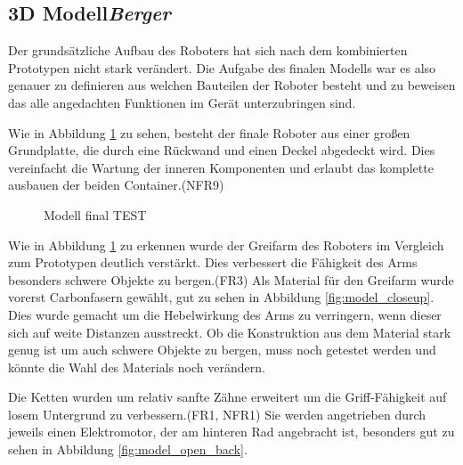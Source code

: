 \subsection{3D Modell\hfill\textnormal{\emph{Berger}}}

Der grundsätzliche Aufbau des Roboters hat sich nach dem kombinierten Prototypen nicht stark verändert.
Die Aufgabe des finalen Modells war es also 
genauer zu definieren aus welchen Bauteilen der Roboter besteht
und zu beweisen das alle angedachten Funktionen im Gerät unterzubringen sind.

Wie in Abbildung \ref{fig:model_open_front} zu sehen, 
besteht der finale Roboter aus einer großen Grundplatte, 
die durch eine Rückwand und einen Deckel abgedeckt wird.
Dies vereinfacht die Wartung der inneren Komponenten
und erlaubt das komplette ausbauen der beiden Container.(NFR9)

\begin{figure}[H]
  \caption{Modell final TEST}
  \label{fig:model_open_front}
\end{figure}

Wie in Abbildung \ref{fig:model_open_front} zu erkennen
wurde der Greifarm des Roboters im Vergleich zum Prototypen deutlich verstärkt.
Dies verbessert die Fähigkeit des Arms besonders schwere Objekte zu bergen.(FR3)
Als Material für den Greifarm wurde vorerst Carbonfasern gewählt,
gut zu sehen in Abbildung \ref{fig:model_closeup}.
Dies wurde gemacht um die Hebelwirkung des Arms zu verringern,
wenn dieser sich auf weite Distanzen ausstreckt.
Ob die Konstruktion aus dem Material stark genug ist 
um auch schwere Objekte zu bergen,
muss noch getestet werden und könnte die Wahl des Materials noch verändern.

Die Ketten wurden um relativ sanfte Zähne erweitert 
um die Griff-Fähigkeit auf losem Untergrund zu verbessern.(FR1, NFR1)
Sie werden angetrieben durch jeweils einen Elektromotor,
der am hinteren Rad angebracht ist,
besonders gut zu sehen in Abbildung \ref{fig:model_open_back}.

